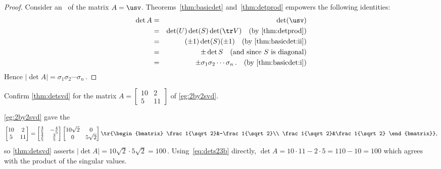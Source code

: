 \begin{proof} 
Consider an \svd\ of the matrix \(A=\usv\).
Theorems~\ref{thm:basicdet} and~\ref{thm:detprod} empowers the following identities:
\begin{eqnarray*}
\det A&=&\det(\usv)
\\&=&\det(U)\det(S)\det(\tr V)
\quad(\text{by \autoref{thm:detprod}})
\\&=&(\pm 1)\det(S)(\pm 1)
\quad(\text{by \autoref{thm:basicdet:ii}})
\\&=&\pm \det S
\quad(\text{and since \(S\) is diagonal})
\\&=&\pm \sigma_1\sigma_2\cdots\sigma_n\,.
\quad(\text{by \autoref{thm:basicdet:i}})
\end{eqnarray*}
Hence \(|\det A|=\sigma_1\sigma_2\cdots\sigma_n\)\,.
\end{proof}

\begin{example} \label{eg:}
Confirm \autoref{thm:detsvd} for the matrix \(A=\begin{bmatrix} 10&2\\5&11 \end{bmatrix}\) of \autoref{eg:2by2svd}.
\begin{solution} 
\autoref{eg:2by2svd} gave the \svd
\begin{equation*}
\begin{bmatrix} 10&2\\5&11 \end{bmatrix}=
\begin{bmatrix} \frac35&-\frac45\\\frac45&\frac35 \end{bmatrix}
\begin{bmatrix} 10\sqrt2&0\\0&5\sqrt2 \end{bmatrix}
\tr{\begin{bmatrix} \frac1{\sqrt2}&-\frac1{\sqrt2}\\ \frac1{\sqrt2}&\frac1{\sqrt2} \end{bmatrix}},
\end{equation*}
so \autoref{thm:detsvd} asserts \(|\det A|=10\sqrt2\cdot5\sqrt 2=100\)\,.
Using~\eqref{eq:dets23b} directly, \(\det A=10\cdot11-2\cdot 5=110-10=100\) which agrees with the product of the singular values.
\end{solution}
\end{example}






